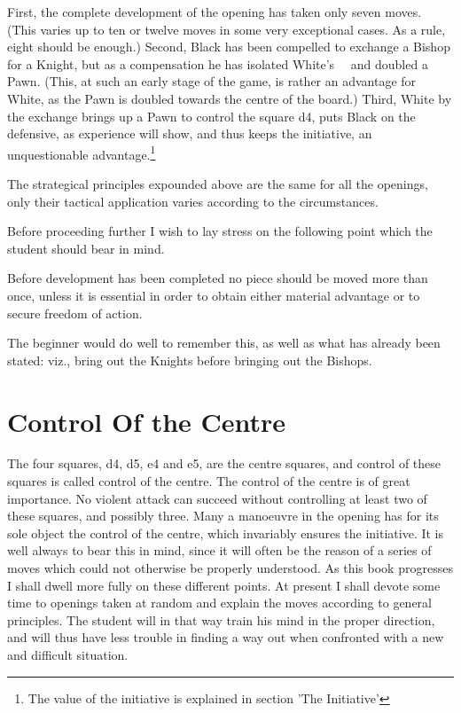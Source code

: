 \documentclass[11pt,a4paper]{book}
\begin{document}
First, the complete development of the opening has taken only seven moves. (This varies up to ten or twelve moves in some very exceptional cases. As a rule, eight should be enough.) Second, Black has been compelled to exchange a Bishop for a Knight, but as a compensation he has isolated White's \queen \ \rook \ \pawn and doubled a Pawn. (This, at such an early stage of the game, is rather an advantage for White, as the Pawn is doubled towards the centre of the board.) Third, White by the exchange brings up a Pawn to control the square d4, puts Black on the defensive, as experience will show, and thus keeps the initiative, an unquestionable advantage.\footnote{The value of the initiative is explained in section 'The Initiative'}

The strategical principles expounded above are the same for all the openings, only their tactical application varies according to the circumstances.

Before proceeding further I wish to lay stress on the following point which the student should bear in mind.

Before development has been completed no piece should be moved more than once, unless it is essential in order to obtain either material advantage or to secure freedom of action.

The beginner would do well to remember this, as well as what has already been stated: viz., bring out the Knights before bringing out the Bishops.

\section{Control Of the Centre}
The four squares, d4, d5, e4 and e5, are the centre squares, and control of these squares is called control of the centre. The control of the centre is of great importance. No violent attack can succeed without controlling at least two of these squares, and possibly three. Many a manoeuvre in the opening has for its sole object the control of the centre, which invariably ensures the initiative. It is well always to bear this in mind, since it will often be the reason of a series of moves which could not otherwise be properly understood. As this book progresses I shall dwell more fully on these different points. At present I shall devote some time to openings taken at random and explain the moves according to general principles. The student will in that way train his mind in the proper direction, and will thus have less trouble in finding a way out when confronted with a new and difficult situation.
\end{document}
